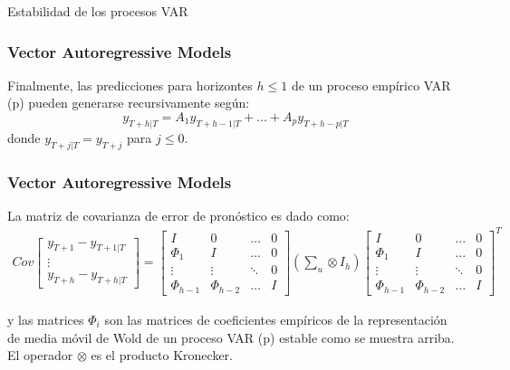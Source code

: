 \documentclass[spanish,xcolor=table]{beamer}
\begin{document}
\begin{section}{Estabilidad de los procesos VAR}
\begin{frame}
\end{frame}
\begin{frame}
\frametitle{Vector Autoregressive Models}

Finalmente, las predicciones para horizontes $h \le 1$ de un proceso emp\'{i}rico VAR (p) pueden generarse recursivamente seg\'un:
\begin{equation*}
y_{T + h | T} = A_1y_{T + h-1 | T} + \dots{} + A_py_{T + h-p | T} 
\end{equation*}
donde $y_{T + j | T} = y_{T + j}$ para $j \le 0$. 
\end{frame}
\begin{frame}
\frametitle{Vector Autoregressive Models}
La matriz de covarianza de error de pron\'ostico es dado como:\\
\footnotesize
\begin{gather*}
Cov\begin{bmatrix} y_{T + 1} - y_{T + 1 | T} \\ \vdots{} \\ y_{T + h} - y_{T + h | T} \end{bmatrix}
=
\begin{bmatrix} I & 0 & \dots{} & 0 \\
\Phi_1 & I & \dots{}  & 0 \\
\vdots{} & \vdots{} & \ddots{} &  0 \\
\Phi_{h-1} & \Phi_{h-2} & \dots{} & I 
\end{bmatrix}
(\sum_u \otimes I_h)
\begin{bmatrix} I & 0 & \dots{} & 0 \\
\Phi_1 & I & \dots{}  & 0 \\
\vdots{} & \vdots{} & \ddots{} &  0 \\
\Phi_{h-1} & \Phi_{h-2} & \dots{} & I 
\end{bmatrix}^T
\end{gather*}

y las matrices $\Phi_i$ son las matrices de coeficientes emp\'{i}ricos de la representaci\'on de media m\'ovil de Wold de un proceso VAR (p) estable como se muestra arriba. El operador $\otimes$ es el producto Kronecker.

\end{frame}
\end{section}
\end{document}

